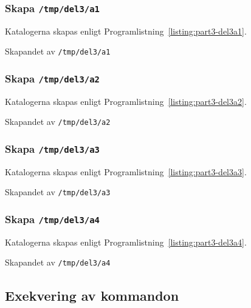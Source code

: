 \subsubsection{Skapa \texttt{/tmp/del3/a1}}
Katalogerna skapas enligt Programlistning~\ref{listing:part3-del3a1}.

\begin{listing}[H]
\caption{Skapandet av \texttt{/tmp/del3/a1}}
\label{listing:part3-del3a1}
\end{listing}

\subsubsection{Skapa \texttt{/tmp/del3/a2}}
Katalogerna skapas enligt Programlistning~\ref{listing:part3-del3a2}.

\begin{listing}[H]
\caption{Skapandet av \texttt{/tmp/del3/a2}}
\label{listing:part3-del3a2}
\end{listing}

\subsubsection{Skapa \texttt{/tmp/del3/a3}}
Katalogerna skapas enligt Programlistning~\ref{listing:part3-del3a3}.

\begin{listing}[H]
\caption{Skapandet av \texttt{/tmp/del3/a3}}
\label{listing:part3-del3a3}
\end{listing}

\subsubsection{Skapa \texttt{/tmp/del3/a4}}
Katalogerna skapas enligt Programlistning~\ref{listing:part3-del3a4}.

\begin{listing}[H]
\caption{Skapandet av \texttt{/tmp/del3/a4}}
\label{listing:part3-del3a4}
\end{listing}


\subsection{Exekvering av kommandon}
%
%
%



